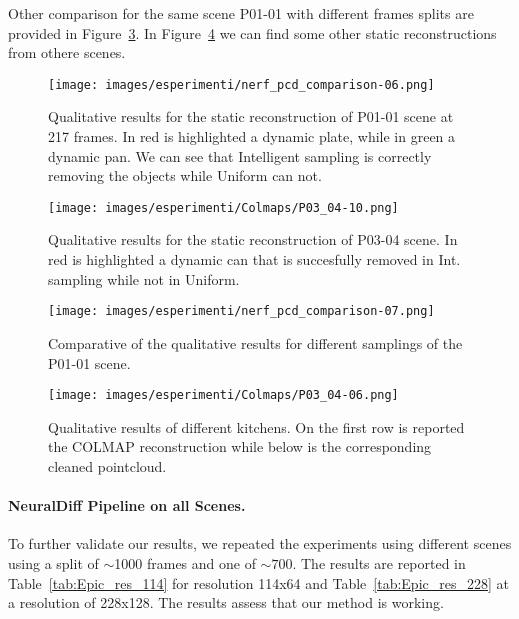 Other comparison for the same scene P01-01 with different frames splits are provided in Figure~\ref{fig:statP01_02}. In Figure~\ref{fig:reco} we can 
find some other static reconstructions from othere scenes.
\begin{figure}[t]
    \centering
    \texttt{[image: images/esperimenti/nerf\_pcd\_comparison-06.png]} 
    \caption{Qualitative results for the static reconstruction of P01-01 scene at 217 frames. In red is highlighted
            a dynamic plate, while in green a dynamic pan. We can see that Intelligent sampling is correctly
            removing the objects while Uniform can not.}\label{fig:statP01_01}
\end{figure}
\begin{figure}[H]
    \centering
    \texttt{[image: images/esperimenti/Colmaps/P03\_04-10.png]} 
    \caption{Qualitative results for the static reconstruction of P03-04 scene. In red is highlighted
            a dynamic can that is succesfully removed in Int. sampling while not in Uniform.}\label{fig:col_p03}
\end{figure}
\begin{figure}[H]
    
     {\texttt{[image: images/esperimenti/nerf\_pcd\_comparison-07.png]} }
    \caption{Comparative of the qualitative results for different samplings of the P01-01 scene.}\label{fig:statP01_02}
\end{figure}

\begin{figure}[H]
    \centering
    {\texttt{[image: images/esperimenti/Colmaps/P03\_04-06.png]} }
    \caption{Qualitative results of different kitchens. On the first row is reported the COLMAP reconstruction
    while below is the corresponding cleaned pointcloud.}\label{fig:reco}
\end{figure}


\paragraph{NeuralDiff Pipeline on all Scenes.}
To further validate our results, we repeated the experiments using different scenes using a split of $\sim$1000 frames and one of $\sim700$.
 The results are reported in Table~\ref{tab:Epic_res_114} for resolution 114x64 and Table~\ref{tab:Epic_res_228} at 
 a resolution of 228x128. The results assess that our method is working.
 


